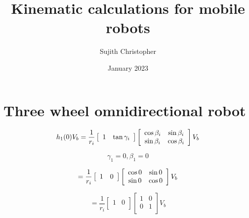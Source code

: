 \documentclass{article}
\title{Kinematic calculations for mobile robots}
\author{Sujith Christopher}
\date{January 2023}
\begin{document}
\maketitle

\section{Three wheel omnidirectional robot}

\begin{equation}
    h_1(0) V_b = \frac{1}{r_i} \left[\begin{array}{cc}
            1 & \tan\gamma_i \\
        \end{array}\right]
    \left[\begin{array}{cc}
            \cos \beta_i    & \sin \beta_i \\
            \- \sin \beta_i & \cos \beta_i \\
        \end{array}\right] V_b
\end{equation}

\begin{equation}
    \gamma_1 = 0, \beta_1 = 0
\end{equation}

\begin{equation}
    = \frac{1}{r_i} \left[\begin{array}{cc}
            1 & 0 \\
        \end{array}\right]
    \left[\begin{array}{cc}
            \cos 0    & \sin 0 \\
            \- \sin 0 & \cos 0 \\
        \end{array}\right] V_b
\end{equation}

\begin{equation}
    = \frac{1}{r_i} \left[\begin{array}{cc}
            1 & 0 \\
        \end{array}\right]
    \left[
        \begin{array}{cc}
            1 & 0 \\
            0 & 1 \\
        \end{array}\right]
    V_b
\end{equation}
\end{document}
